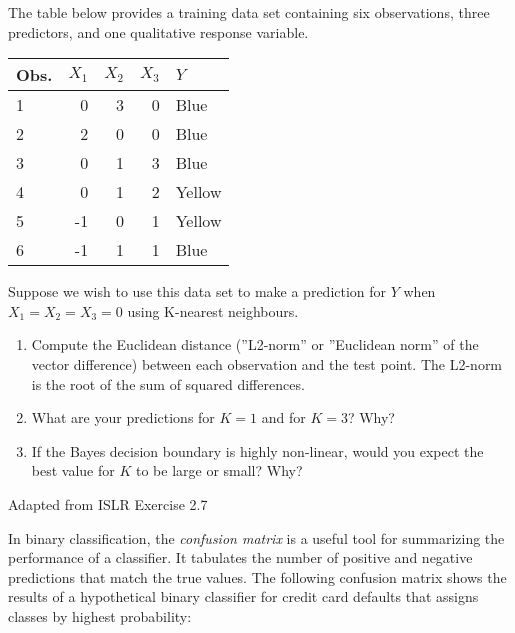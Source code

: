\begin{exercisebox}
The table below provides a training data set containing six observations, three predictors, and one qualitative response variable.\\ 
\vspace{.5\baselineskip}
\begin{center}
\footnotesize
\renewcommand{\arraystretch}{1.1}
\begin{tabular}{l|r|r|r|l} \hline
Obs. & $X_1$ & $X_2$ & $X_3$ & $Y$ \\ \hline
1 & 0 & 3 & 0 & Blue \\
2 & 2 & 0 & 0 & Blue \\
3 & 0 & 1 & 3 & Blue \\
4 & 0 & 1 & 2 & Yellow \\
5 & -1 & 0 & 1 & Yellow \\
6 & -1 & 1 & 1 & Blue \\ \hline
\end{tabular}
\end{center}

\vspace{.5\baselineskip}
Suppose we wish to use this data set to make a prediction for $Y$ when $X_1=X_2=X_3=0$ using K-nearest neighbours.
\vspace{.5\baselineskip}
\begin{enumerate}
  \item Compute the Euclidean distance (''L2-norm'' or ''Euclidean norm'' of the vector difference) between each observation and the test point. The L2-norm is the root of the sum of squared differences.
  \item What are your predictions for $K=1$ and for $K=3$? Why?
  \item If the Bayes decision boundary is highly non-linear, would you expect the best value for $K$ to be large or small? Why?
\end{enumerate}

\vspace{.5\baselineskip}\scriptsize Adapted from ISLR Exercise 2.7
\end{exercisebox}

In binary classification, the \emph{confusion matrix} is a useful tool for summarizing the performance of a classifier. It tabulates the number of positive and negative predictions that match the true values. The following confusion matrix shows the results of a hypothetical binary classifier for credit card defaults that assigns classes by highest probability:

